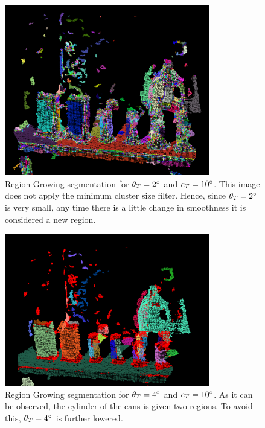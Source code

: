 \documentclass[../main.tex]{subfiles}
\begin{document}
\begin{figure}[htbp]
    \centering
    \includegraphics[width=0.8\textwidth]{images/region_growing_testbench_st2_nofil.png}
    \caption{Region Growing segmentation for $\theta_{T}=2\degree$ and $c_{T}=10\degree$. This image does not apply the minimum cluster size filter. Hence, since $\theta_{T}=2\degree$ is very small, any time there is a little change in smoothness it is considered a new region.}
    \label{fig:region_growing_testbench_st2_nofil}
\end{figure}

\begin{figure}[htbp]
    \centering
    \includegraphics[width=0.8\textwidth]{images/region_growing_testbench_st4.png}
    \caption{Region Growing segmentation for $\theta_{T}=4\degree$ and $c_{T}=10\degree$. As it can be observed, the cylinder of the cans is given two regions. To avoid this, $\theta_{T}=4\degree$ is further lowered.}
    \label{fig:region_growing_testbench_st4}
\end{figure}
\end{document}

